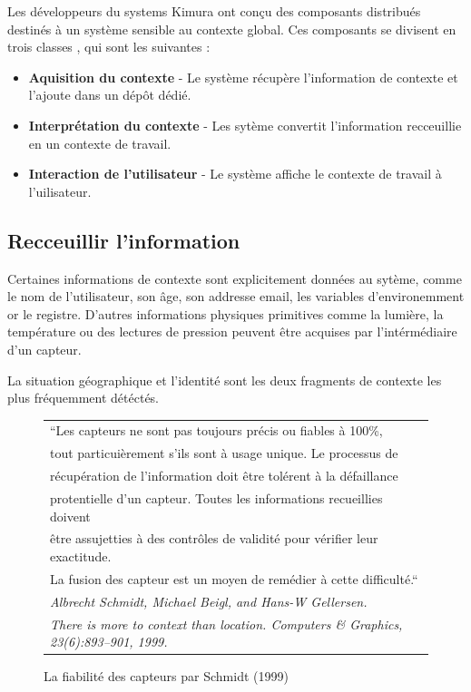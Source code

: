 Les développeurs du systems Kimura ont conçu des composants distribués destinés
à un système sensible au contexte global. Ces composants se divisent en trois
classes \cite{voida_integrating_2002}, qui sont les suivantes :

\begin{itemize}
  \item \textbf{Aquisition du contexte} - Le système récupère l'information de
	  contexte et l'ajoute dans un dépôt dédié.
  \item \textbf{Interprétation du contexte} - Les sytème convertit l'information
	  recceuillie en un contexte de travail.
  \item \textbf{Interaction de l'utilisateur} - Le système affiche le contexte
	  de travail à l'uilisateur.
\end{itemize}

\subsection{Recceuillir l'information}

Certaines informations de contexte sont explicitement données au sytème, comme
le nom de l'utilisateur, son âge, son addresse email, les variables
d'environemment or le registre. D'autres informations physiques primitives comme
la lumière, la température ou des lectures de pression peuvent être acquises par
l'intérmédiaire d'un capteur.

La situation géographique et l'identité sont les deux fragments de contexte les
plus fréquemment détéctés.

\begin{figure}[h]
  \centering
  \begin{tabular}{l}
    ``Les capteurs ne sont pas toujours précis ou fiables à 100\%, \\
    tout particuièrement s'ils sont à usage unique. Le processus de \\
    récupération de l'information doit être tolérent à la défaillance \\
    protentielle d'un capteur. Toutes les informations recueillies doivent \\
    être assujetties à des contrôles de validité pour vérifier leur exactitude.\\
    La fusion des capteur est un moyen de remédier à cette difficulté.``
    \cite{schmidt_there_1999} \\
    \em \footnotesize Albrecht Schmidt, Michael Beigl, and Hans-W Gellersen. \\
    \em \footnotesize There is more to context than location. Computers \&
    Graphics, 23(6):893–901, 1999.
  \end{tabular}
  \caption{La fiabilité des capteurs par Schmidt (1999)}
  \label{fig:quote}
\end{figure}

